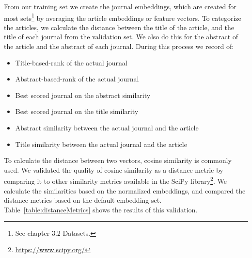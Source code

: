 \documentclass[../../Thesis.tex]{subfiles}
\begin{document}
From our training set we create the journal embeddings, which are created for most sets\footnote{See chapter 3.2 Datasets.} by averaging the article embeddings or feature vectors.
\clearpage
{}
To categorize the articles, we calculate the distance between the title of the article, and the title of each journal from the validation set. We also do this for the abstract of the article and the abstract of each journal. During this process we record of:
\begin{itemize}
\item{Title-based-rank of the actual journal}
\item{Abstract-based-rank of the actual journal}
\item{Best scored journal on the abstract similarity}
\item{Best scored journal on the title similarity}
\item{Abstract similarity between the actual journal and the article}
\item{Title similarity between the actual journal and the article}
\end{itemize}
To calculate the distance between two vectors, cosine similarity is commonly used. We validated the quality of cosine similarity as a distance metric by comparing it to other similarity metrics available in the SciPy library\footnote{\url{https://www.scipy.org/}}. We calculate the similarities based on the normalized embeddings, and compared the distance metrics based on the default embedding set. Table~\ref{table:distanceMetrics} shows the results of this validation.\\
\end{document}

